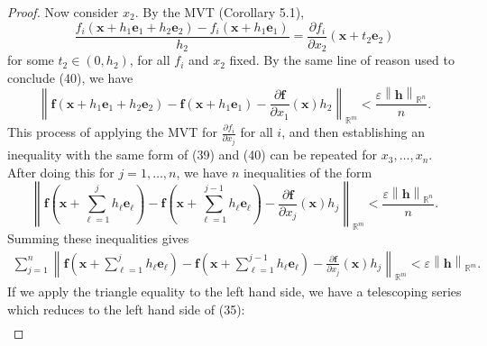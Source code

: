 \documentclass{article}
\newcommand{\R}{\mathbb{R}}
\newcommand{\x}{\mathbf{x}}
\newcommand{\f}{\mathbf{f}}
\newcommand{\h}{\mathbf{h}}
\newcommand{\norm}[1]{\left\lVert#1\right\rVert}
\theoremstyle{definition}
\begin{document}
\begin{proof}
		Now consider $ x_2 $. By the MVT (Corollary 5.1), \begin{equation*}\label{key}
			\frac{f_i(\x + h_1\mathbf e_1 +h_2\mathbf e_2 ) - f_i(\x+ h_1\mathbf e_1 )}{h_2} = \frac{\partial f_i}{\partial x_2}(\x + t_2\mathbf e_2)
		\end{equation*}for some $ t_2 \in (0,h_2) $, for all $ f_i $ and $ x_2 $ fixed. By the same line of reason used to conclude (40), we have 
		\begin{equation}\label{key}
			\norm{\f(\x + h_1\mathbf e_1 +  h_2\mathbf e_2) - \f(\x + h_1\mathbf e_1) - \frac{\partial \f}{\partial x_1}(\x)h_2}_{\R^m} < \frac{\varepsilon\norm{\h}_{\R^n}}{n}. 
		\end{equation}
		This process of applying the MVT for $ \frac{\partial f_i}{\partial x_j} $ for all $ i $, and then establishing an inequality with the same form of (39) and (40) can be repeated for $ x_3,\ldots,x_n $. After doing this for $ j=1,\ldots, n $, we have $ n $ inequalities of the form
		\begin{equation*}\label{key}
			\norm{\f\left(\x + \textstyle\sum_{\ell=1}^j h_\ell \mathbf e_\ell\right) - \f\left(\x + \textstyle\sum_{\ell=1}^{j-1} h_\ell \mathbf e_\ell\right) - \frac{\partial \f}{\partial x_j}(\x)h_j}_{\R^m} < \frac{\varepsilon\norm{\h}_{\R^n}}{n}.  
		\end{equation*}
		Summing these inequalities gives
		\begin{align} \sum_{j=1}^{n}\norm{\f\left(\x + \textstyle\sum_{\ell=1}^j h_\ell \mathbf e_\ell\right) - \f\left(\x + \textstyle\sum_{\ell=1}^{j-1} h_\ell \mathbf e_\ell\right) - \frac{\partial \f}{\partial x_j}(\x)h_j}_{\R^m}  < \varepsilon\norm{\h}_{\R^m}.
		\end{align}
		If we apply the triangle equality to the left hand side, we have a telescoping series which reduces to the left hand side of (35): {\tiny
			\begin{align*}

\end{align*}}
\end{proof}
\end{document}
